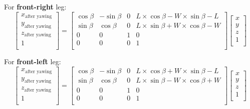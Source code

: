 For \textbf{front-right} leg:
\begin{equation}
   \begin{bmatrix}
   x_\text{after yawing} \\
   y_\text{after yawing} \\
   z_\text{after yawing} \\
   1                     \\
   \end{bmatrix}
   =
   \begin{bmatrix}
   \cos\beta & -\sin\beta & 0 & L \times \cos\beta - W \times \sin\beta - L \\
   \sin\beta & \cos\beta & 0 & L \times \sin\beta + W \times \cos\beta - W \\
   0 & 0 & 1 & 0 \\
   0 & 0 & 0 & 1 \\
   \end{bmatrix}
   \begin{bmatrix}
   x \\
   y \\
   z \\
   1 \\
   \end{bmatrix}
\end{equation}

For \textbf{front-left} leg:
\begin{equation}
   \begin{bmatrix}
   x_\text{after yawing} \\
   y_\text{after yawing} \\
   z_\text{after yawing} \\
   1                     \\
   \end{bmatrix}
   =
   \begin{bmatrix}
   \cos\beta & -\sin\beta & 0 & L \times \cos\beta + W \times \sin\beta - L \\
   \sin\beta & \cos\beta & 0 & L \times \sin\beta - W \times \cos\beta + W \\
   0 & 0 & 1 & 0 \\
   0 & 0 & 0 & 1 \\
   \end{bmatrix}
   \begin{bmatrix}
   x \\
   y \\
   z \\
   1 \\
   \end{bmatrix}
\end{equation}

